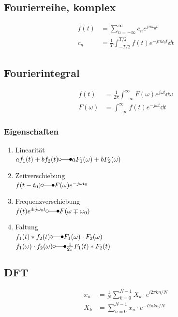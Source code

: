 \documentclass[10pt,a4paper]{article}
\begin{document}
  \subsection{Fourierreihe, komplex}
  \begin{mdframed}[style=exercise]
    \begin{align}
      f(t) &= \sum_{n=-\infty}^{\infty} c_n e^{jn\omega_0 t}\\
      c_n &= \frac{1}{T} \int_{-T/2}^{T/2} f(t) e^{-jn\omega_0 t}\dd{t}\nonumber
    \end{align}
  \end{mdframed}
  \subsection{Fourierintegral}
  \begin{mdframed}[style=exercise]
    \begin{align}
      f(t) &= \frac{1}{2\pi} \int_{-\infty}^{\infty} F(\omega) e^{j\omega t} \dd{\omega}\\
      F(\omega) &= \int_{-\infty}^{\infty} f(t) e^{-j\omega t} \dd{t}
    \end{align}
  \end{mdframed}
  \subsubsection{Eigenschaften}
  \begin{mdframed}[style=exercise]
    \begin{enumerate}
      \item Linearität\\
      $a f_1(t) + b f_2(t) \laplace a F_1(\omega) + b F_2(\omega)$
      \item Zeitverschiebung\\
      $f(t-t_0) \laplace F(\omega)e^{-j\omega t_0}$
      \item Frequenzverschiebung\\
      $f(t) e^{\pm j\omega_0 t}\laplace F(\omega\mp \omega_0)$
      \item Faltung\\
      $f_1(t)*f_2(t)\laplace F_1(\omega)\cdot F_2(\omega)$\\
      $f_1(\omega)\cdot f_2(\omega)\laplace \frac{1}{2\pi}F_1(t)*F_2(t)$
    \end{enumerate}
  \end{mdframed}
  \subsection{DFT}
  \begin{mdframed}[style=exercise]
    \begin{align}
      x_n &= \frac{1}{N} \sum_{k=0}^{N-1} X_k\cdot e^{i 2 \pi k n / N}\\
      X_k &= \sum_{n=0}^{N-1} x_n\cdot e^{-i 2 \pi k n / N}
    \end{align}
  \end{mdframed}
\end{document}
